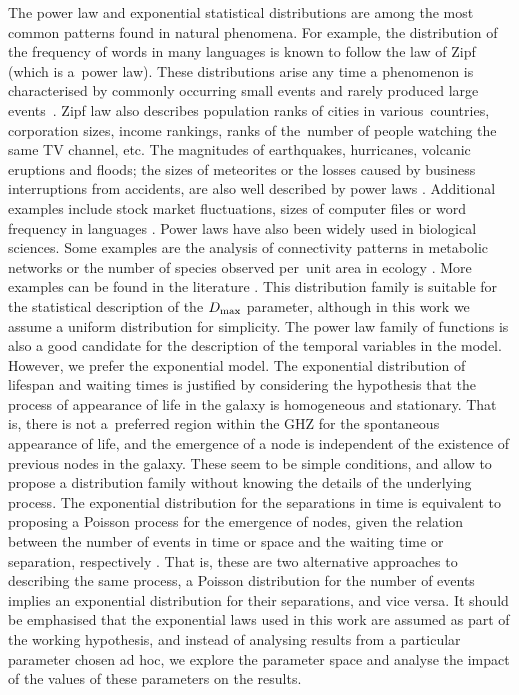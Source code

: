 \documentclass[crop]{CSLB}
\begin{document}
The power law and exponential statistical distributions are among the most
common patterns found in natural phenomena.
%
For example, the distribution of the frequency of words in many languages is
known to follow the law of Zipf (which is a power law).
%
These distributions arise any time a phenomenon is characterised by commonly
occurring small events and rarely produced large events \citep[e.g.
][]{adamic_zipf_2000}.
%
Zipf law also describes population ranks of cities in various countries,
corporation sizes, income rankings, ranks of the number of people watching the
same TV channel, etc.
%
The magnitudes of earthquakes, hurricanes, volcanic eruptions and floods; the
sizes of meteorites or the losses caused by business interruptions from
accidents, are also well described by power laws
\citep{sornette_critical_2006}.
%
Additional examples include stock market fluctuations, sizes of computer files
or word frequency in languages \citep{mitzenmacher_brief_2004,
newman_power_2005, simkin_theory_2006}. 
%
Power laws have also been widely used in biological sciences.
%
Some examples are the analysis of connectivity patterns in metabolic networks
\citep{jeong_large_2000} or the number of species observed per unit area in
ecology \citep{martin_origin_2006, frank_common_2009}.
%
More examples can be found in the literature \citep{martin_origin_2006,
maccone_KLT_2010, barabasi_scale_2009, maccone_evolution_2014, maccone_lognormals_2014}.
%
This distribution family is suitable for the statistical description
of the $D_{\rm max}$ parameter, although in this work we assume a uniform
distribution for simplicity.
%
The power law family of functions is also a good candidate for the description of
the temporal variables in the model.
%
However, we prefer the exponential model.
%
The exponential distribution of lifespan and waiting times is justified by
considering the hypothesis that the process of appearance of life in the galaxy
is homogeneous and stationary.
%
That is, there is not a preferred region within
the GHZ for the spontaneous appearance of life, and the emergence of a node is
independent of the existence of previous nodes in the galaxy.
%
These seem to be simple conditions, and allow to propose a distribution family
without knowing the details of the underlying process.
%
The exponential distribution for the separations in time is equivalent to
proposing a Poisson process for the emergence of nodes, given the relation
between the number of events in time or space and the waiting time or
separation, respectively \citep[e.g., ][]{ross_simulation_2012}.
%
That is, these
are two alternative approaches to describing the same process, a Poisson
distribution for the number of events implies an exponential distribution for
their separations, and vice versa.
%
It should be emphasised that the exponential
laws used in this work are assumed as part of the working hypothesis, and
instead of analysing results from a particular parameter chosen ad hoc, we
explore the parameter space and analyse the impact of the values of these
parameters on the results.
\end{document}
